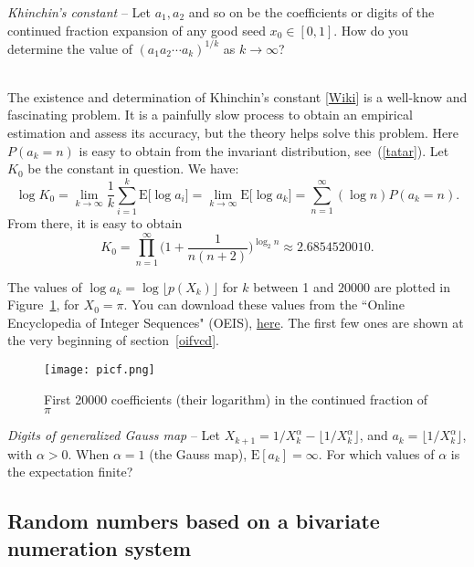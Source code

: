 \documentclass[oneside,10pt]{book}
\begin{document}
\begin{Exercise} {\em Khinchin's constant} -- Let $a_1,a_2$ and so on be the coefficients or digits of the continued fraction expansion of any
good seed $x_0\in [0,1]$. How do you determine the value of $(a_1 a_2\cdots a_k)^{1/k}$ as $k\rightarrow\infty$?
 \vspace{1ex}

 \\
The existence and determination of \textcolor{index}{Khinchin's constant} [\href{https://en.wikipedia.org/wiki/Khinchin\%27s_constant}{Wiki}] is a well-know and fascinating problem. It is a painfully slow process to obtain an empirical estimation and assess its accuracy, but
 the theory helps solve this problem. Here $P(a_k = n)$ is easy to obtain from the invariant distribution, see~(\ref{tatar}). Let $K_0$ be the constant in question. We have:
$$\log K_0 = \lim_{k\rightarrow\infty} \frac{1}{k}\sum_{i=1}^k \text{E}\Big[\log a_i\Big] =\lim_{k\rightarrow\infty}
\text{E}\Big[\log a_k\Big] =
\sum_{n=1}^\infty (\log n) P(a_k=n).$$
From there, it is easy to obtain
$$K_0 = \prod_{n=1}^\infty \Bigg(1+\frac{1}{n(n+2)}\Bigg)^{\log_2 n} \approx 2.6854520010.$$

\noindent The values of $\log a_k = \log \lfloor p(X_k)\rfloor$ for $k$ between 1 and $\num{20000}$ are plotted in Figure~\ref{fig:picf},
 for $X_0 =\pi$. You can download these values from the
``Online Encyclopedia of Integer Sequences" (OEIS), \href{https://oeis.org/A001203}{here}.  The first few ones are shown at the very beginning of section~\ref{oifvcd}.
\end{Exercise}

\begin{figure}[H]
\centering
\texttt{[image: picf.png]}
\caption{First \num{20000} coefficients (their logarithm) in the continued fraction of $\pi$}
\label{fig:picf}
\end{figure}

\begin{Exercise} {\em Digits of generalized Gauss map} -- Let $X_{k+1} = 1/X_k^\alpha  -\lfloor 1/X_k^\alpha\rfloor$, and
$a_k = \lfloor 1/X_k^\alpha\rfloor$, with $\alpha>0$. When $\alpha=1$ (the Gauss map), $\text{E}[a_k]=\infty$. For which values
 of $\alpha$ is the expectation finite?
\end{Exercise}

\subsection{Random numbers based on a bivariate numeration system}\label{vcxzaq}
\end{document}
